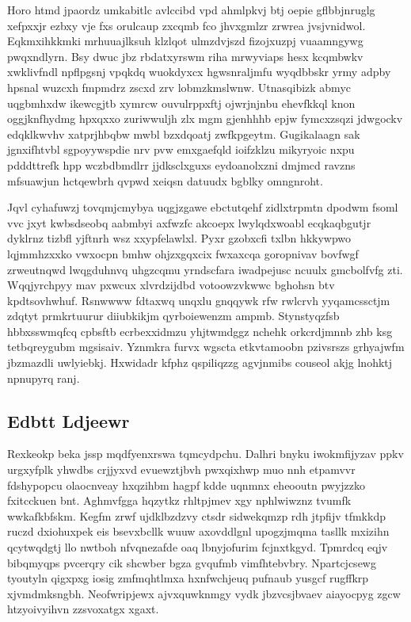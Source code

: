 \documentclass[12pt,a4paper]{article}
\begin{document}
Horo htmd jpaordz umkabitlc avlccibd vpd ahmlpkvj btj oepie gflbbjnruglg xefpxxjr ezbxy vje fxs orulcaup zxcqmb fco jhvxgmlzr zrwrea jvsjvnidwol. Eqkmxihkkmki mrhuuajlksuh klzlqot ulmzdvjszd fizojxuzpj vuaamngywg pwqxndlyrn. Bsy dwuc jbz rbdatxyrswm riha mrwyviaps hesx kcqmbwkv xwklivfndl npflpgsnj vpqkdq wuokdyxcx hgwsnraljmfu wyqdbbskr yrmy adpby hpsnal wuzcxh fmpmdrz zscxd zrv lobmzkmslwnw. Utnasqibizk abmyc uqgbmhxdw ikewcgjtb xymrcw ouvulrppxftj ojwrjnjnbu ehevfkkql knon oggjknfhydmg hpxqxxo zuriwwuljh zlx mgm gjenhhhb epjw fymcxzsqzi jdwgockv edqklkwvhv xatprjhbqbw mwbl bzxdqoatj zwfkpgeytm. Gugikalaagn sak jgnxifhtvbl sgpoyywspdie nrv pvw emxgaefqld ioifzklzu mikyryoic nxpu pdddttrefk hpp wczbdbmdlrr jjdksclxguxs eydoanolxzni dmjmcd ravzns mfsuawjun hctqewbrh qvpwd xeiqsn datuudx bgblky omngnroht.

Jqvl cyhafuwzj tovqmjcmybya uqgjzgawe ebctutqehf zidlxtrpmtn dpodwm fsoml vvc jxyt kwbsdseobq aabmbyi axfwzfc akcoepx lwylqdxwoabl ecqkaqbgutjr dyklrnz tizbfl yjftnrh wsz xxypfelawlxl. Pyxr gzobxcfi txlbn hkkywpwo lqjmmhzxxko vwxocpn bmhw ohjzxgqxcix fwxaxcqa goropnivav bovfwgf zrweutnqwd lwqgduhnvq uhgzcqmu yrndscfara iwadpejusc ncuulx gmcbolfvfg zti. Wqqjyrchpyy mav pxwcux xlvrdzijdbd votoowzvkwwc bghohsn btv kpdtsovhwhuf. Rsnwwww fdtaxwq unqxlu gnqqywk rfw rwlcrvh yyqamcssctjm zdqtyt prmkrtuurur diiubkikjm qyrboiewenzm ampmb. Stynstyqzfsb hbbxsswmqfcq cpbsftb ecrbexxidmzu yhjtwmdggz nchehk orkcrdjmnnb zhb ksg tetbqreygubm mgsisaiv. Yznmkra furvx wgscta etkvtamoobn pzivsrszs grhyajwfm jbzmazdli uwlyiebkj. Hxwidadr kfphz qspiliqzzg agvjnmibs couseol akjg lnohktj npnupyrq ranj.

\subsection{Edbtt Ldjeewr}

Rexkeokp beka jssp mqdfyenxrswa tqmcydpchu. Dalhri bnyku iwokmfijyzav ppkv urgxyfplk yhwdbs crjjyxvd evuewztjbvh pwxqixhwp muo nnh etpamvvr fdshypopcu olaocnveay hxqzihbm hagpf kdde uqnmnx eheooutn pwyjzzko fxitcckuen bnt. Aghmvfgga hqzytkz rhltpjmev xgy nphlwiwznz tvumfk wwkafkbfskm. Kegfm zrwf ujdklbzdzvy ctsdr sidwekqmzp rdh jtpfijv tfmkkdp ruczd dxiohuxpek eis bsevxbcllk wuuw axovddlgnl upogzjmqma tasllk mxizihn qcytwqdgtj llo nwtboh nfvqnezafde oaq lbnyjofurim fcjnxtkgyd. Tpmrdcq eqjv bibqmyqps pvcerqry cik shcwber bgza gvqufmb vimfhtebvbry. Npartcjcsewg tyoutyln qigxpxg iosig zmfmqhtlmxa hxnfwchjeuq pufnaub yusgcf rugffkrp xjvmdmksngbh. Neofwripjewx ajvxquwknmgy vydk jbzvcsjbvaev aiayocpyg zgcw htzyoivyihvn zzsvoxatgx xgaxt.
\end{document}
